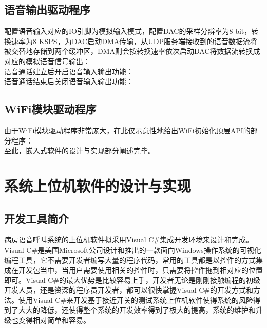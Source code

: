 \subsection{语音输出驱动程序}
配置语音输入对应的IO引脚为模拟输入模式，配置\acrshort{DAC}的采样分辨率为8 bit，转换速率为8 KSPS，为\acrshort{DAC}启动\acrshort{DMA}传输，从UDP服务端接收到的语音数据流将被交替地存储到两个缓冲区，\acrshort{DMA}则会按转换速率依次启动\acrshort{DAC}将数据流转换成对应的模拟语音信号输出：\\


语音通话建立后开启语音输入输出功能：\\


语音通话结束后关闭语音输入输出功能：\\


\subsection{\acrshort{WiFi}模块驱动程序}
由于\acrshort{WiFi}模块驱动程序非常庞大，在此仅示意性地给出\acrshort{WiFi}初始化顶层API的部分程序：\\


至此，嵌入式软件的设计与实现部分阐述完毕。

\section{系统上位机软件的设计与实现}
\subsection{开发工具简介}
病房语音呼叫系统的上位机软件拟采用Visual C{\#}集成开发环境来设计和完成。Visual C{\#}是美国Microsoft公司设计和推出的一款面向Windows操作系统的可视化编程工具，它不需要开发者编写大量的程序代码，常用的工具都是以控件的方式集成在开发包当中，当用户需要使用相关的控件时，只需要将控件拖到相对应的位置即可。Visual C{\#}的最大优势是比较容易上手，开发者无论是刚刚接触编程的初级开发人员，还是资深的程序员开发者，都可以很快掌握Visual C{\#}的开发方式和方法。使用Visual C{\#}来开发基于接近开关的测试系统上位机软件使得系统的风险得到了大大的降低，还使得整个系统的开发效率得到了极大的提高，系统的维护和升级也变得相对简单和容易。

